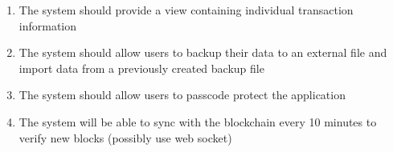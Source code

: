 \begin{adjustwidth}{1.5em}{0pt}
\begin{enumerate}[label=3.\arabic*]
		\item The system should provide a view containing individual transaction information
		
		\item The system should allow users to backup their data to an external file and import data from a previously created backup file
		
		\item The system should allow users to passcode protect the application

    \item The system will be able to sync with the blockchain every 10 minutes to verify new blocks (possibly use web socket)
		
\end{enumerate}


	
\end{adjustwidth}
